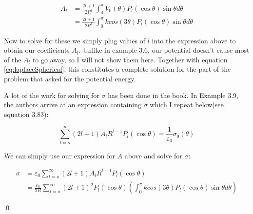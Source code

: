\documentclass{homework}
\newcommand\ve{\varepsilon}
\begin{document}
\begin{homeworkProblem}[Problem 3.19]
{    \begin{align*}
      A_l &= \frac{2l + 1}{2R^l} \int_0^{\pi} V_0(\theta)P_l(\cos \theta) \sin \theta d \theta \\
        &= \frac{2l + 1}{2R^l} \int_0^{\pi}  k cos (3 \theta) P_l(\cos \theta) \sin \theta d \theta
    \end{align*}

     Now to solve for these we simply plug values of $l$ into the expression above to obtain our coefficients $A_l$. Unlike in example 3.6, our potential doesn't cause most of the $A_l$ to go away, so I will not show them here. Together with
     equation \ref{eq:laplaceSpherical}, this constitutes a complete solution for the part of the problem that asked for the potential energy.

    A lot of the work for solving for $\sigma$ has been done in the book. In Example 3.9, the authors  arrive at an expression containing $\sigma$ which I repeat below(see equation 3.83):

    $$\sum_{l=o}^{\infty} (2l + 1) A_l R^{l-1} P_l(\cos \theta) = \frac{1}{\ve_0} \sigma_0(\theta) $$

    We can simply use our expression for $A$ above and solve for $\sigma$:

    \begin{align*}
      \sigma &= \ve_0 \sum_{l=o}^{\infty} (2l + 1) A_l R^{l-1} P_l(\cos \theta) \\
        &= \frac{\ve_0}{2R} \sum_{l=o}^{\infty} (2l + 1)^2  P_l(\cos \theta) \left( \int_0^{\pi}  k cos (3 \theta) P_l(\cos \theta) \sin \theta d \theta\right)
    \end{align*}

    \qed
  }
\end{homeworkProblem}
\end{document}
